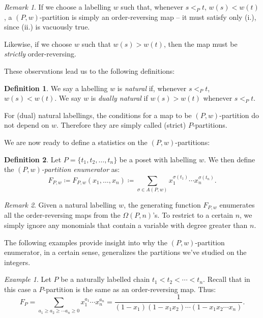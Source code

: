 \documentclass[11pt]{amsart}
\theoremstyle{plain}
\theoremstyle{definition}
\newtheorem{definition}{Definition}
\theoremstyle{remark}
\newtheorem{remark}{Remark}[section]
\newtheorem{example}{Example}[section]
\numberwithin{equation}{section}
\begin{document}
\begin{remark}
	If we choose a labelling $w$ such that, whenever $s <_P t$, $w(s) < w(t)$, a $(P, w)$-partition is
	simply an order-reversing map -- it must satisfy only (i.), since (ii.) is vacuously true.

	Likewise, if we choose $w$ such that $w(s) > w(t)$, then the map must be \textit{strictly} order-reversing.
\end{remark}

These observations lead us to the following definitions:

\begin{definition}
	We say a labelling $w$ is \textit{natural} if, whenever $s <_P t$, $w(s) < w(t)$. We say $w$ is \textit{dually natural} if
	$w(s) > w(t)$ whenever $s <_P t$. \smallskip
\end{definition}

For (dual) natural labellings, the conditions for a map to be $(P, w)$-partition do not depend on $w$. Therefore they are simply
called (strict) $P$-partitions. \smallskip

We are now ready to define a statistics on the $(P, w)$-partitions:

\begin{definition}
	Let $P = \{t_1, t_2, \ldots, t_n\}$ be a poset with labelling $w$. We then define the \textit{$(P, w)$-partition enumerator} as:
	\[
		F_{P, w} \coloneq F_{P, w}(x_1, \ldots, x_n) \coloneq \sum_{\sigma \in A(P, w)} x_1^{\sigma(t_1)} \cdots x_n^{\sigma(t_n)}.
	\]
\end{definition}

\begin{remark}
	Given a natural labelling $w$, the generating function $F_{P, w}$ enumerates all the order-reversing maps from the $\Omega(P, n)$'s. To restrict
	to a certain $n$, we simply ignore any monomials that contain a variable with degree greater than $n$.
\end{remark}

The following examples provide insight into why the $(P, w)$-partition enumerator, in a certain sense, generalizes the partitions we've studied on the integers.

\begin{example} \label{ex:chain_n}
	Let $P$ be a naturally labelled chain $t_1 < t_2 < \cdots < t_n$. Recall that in this case a $P$-partition is the same as an order-reversing map. Thus:
	\[
		F_P = \sum_{a_1 \geq a_2 \geq \cdots a_n \geq 0} x_1^{a_1} \cdots x_n^{a_n} = \frac{1}{(1-x_1) (1-x_1 x_2) \cdots (1 - x_1 x_2 \cdots x_n)}.
	\]
\end{example}
\end{document}
